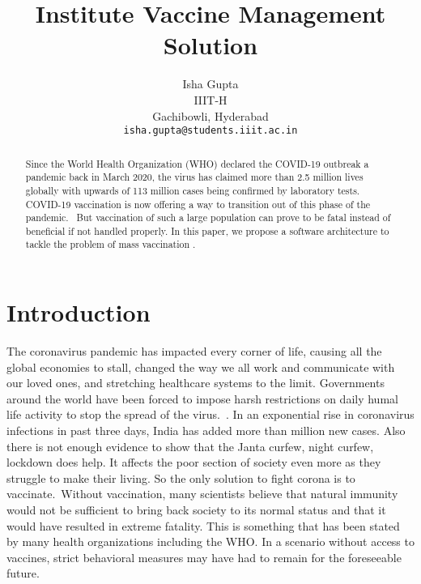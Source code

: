 \documentclass[10pt,twocolumn,letterpaper]{article}
\begin{document}
\title{Institute Vaccine Management Solution}

\author{Isha Gupta\\
IIIT-H\\
Gachibowli, Hyderabad\\
{\tt\small isha.gupta@students.iiit.ac.in}
}

\maketitle

\begin{abstract}
   Since the World Health Organization (WHO) declared the COVID-19 outbreak a pandemic back in March 2020, the virus has claimed more than 2.5 million lives globally with upwards of 113 million cases being confirmed by laboratory tests. COVID-19 vaccination is now offering a way to transition out of this phase of the pandemic.~\cite{Authors14} But vaccination of such a large population can prove to be fatal instead of beneficial if not handled properly. In this paper, we propose a software architecture to tackle the problem of mass vaccination . 
\end{abstract}

\section{Introduction}

The coronavirus pandemic has impacted every corner of life, causing all the global economies to stall, changed the way we all work and communicate with our loved ones, and stretching healthcare systems to the limit. Governments around the world have been forced to impose harsh restrictions on daily humal life activity to stop the spread of the virus.~\cite{Authors14}. In an exponential rise in coronavirus infections in past three days, India has added more than million new cases. Also there is not enough evidence to show that the Janta curfew, night curfew, lockdown does help. It affects the poor section of society even more as they struggle to make their living. So the only solution to fight corona is to vaccinate.~\cite{Alpher02}Without vaccination, many scientists believe that natural immunity would not be sufficient to bring back society to its normal status and that it would have resulted in extreme fatality. This is something that has been stated by many health organizations including the WHO. In a scenario without access to vaccines, strict behavioral measures may have had to remain for the foreseeable future.~\cite{Authors14}
\end{document}
